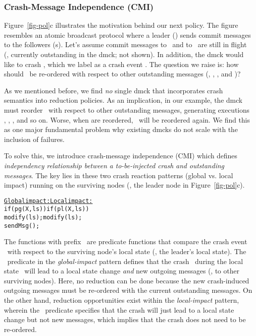 

\subsubsection{Crash-Message Independence (CMI)}
\label{sam-cmi}


Figure~\ref{fig-pol}c illustrates the motivation behind our next
policy.  The figure resembles an atomic broadcast protocol where a
leader () sends commit messages to the followers (s).
Let's assume commit messages  to \fone\ and  to \ftwo\
are still in flight (\ie, currently outstanding in the dmck; not
shown).  In addition, the dmck would like to crash \ftri, which we
label as a crash event \xx.  The question we raise is: how should \xx\
be re-ordered with respect to other outstanding messages
(\ma, \mb, \mc, and \md)?


As we mentioned before, we find {\em no} single dmck that incorporates
crash semantics into reduction policies.  As an implication, in our
example, the dmck must reorder \xx\ with respect to other outstanding
messages, generating executions \ts{Xabcd}, \ts{aXbcd}, \ts{abXcd},
and so on.  Worse, when \ts{abcd} are reordered, \xx\ will be
reordered again.  We find this as one major fundamental problem why
existing dmcks do not scale with the inclusion of failures.

To solve this, we introduce crash-message independence (CMI) which
defines {\em independency relationship between a to-be-injected crash
and outstanding messages}.  The key lies in these two crash reaction
patterns (global vs. local impact) running on the surviving nodes
(\eg, the leader node in Figure~\ref{fig-pol}c).


\begin{minipage}{\textwidth}
\begin{alltt}
\vfive
      \underline{Global impact:}       \underline{Local impact:}
      if (pg(X,ls))         if (pl(X,ls)) 
        modify(ls);           modify(ls);
        sendMsg();           
\end{alltt}
\vfive
\end{minipage}


The functions with prefix \pp\ are predicate functions that compare
the crash event \xx\ with respect to the surviving node's local state
(\eg, the leader's local state).  The \pg\ predicate in the {\em
global-impact} pattern defines that the crash \xx\ during the local
state \ls\ will lead to a local state change {\em and} new outgoing
messages (\eg, to other surviving nodes).  Here, no reduction can be
done because the new crash-induced outgoing messages must be
re-ordered with the current outstanding messages.  On the other hand,
reduction opportunities exist within the {\em local-impact} pattern,
wherein the \pl\ predicate specifies that the crash will just lead to
a local state change but not new messages, which implies that the
crash does not need to be re-ordered.  


